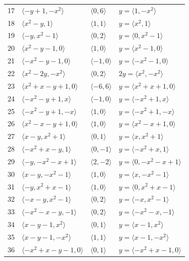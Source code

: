 \documentclass[11pt]{article}
\begin{document}
\begin{longtable}{@{}rlll@{}}
17 & $\langle -y+1,-x^{2}\rangle$ & $\langle 0,6\rangle$ & $y=\langle 1,-x^{2}\rangle$\\
18 & $\langle x^{2}-y,1\rangle$ & $\langle 1,1\rangle$ & $y=\langle x^{2},1\rangle$\\
19 & $\langle -y,x^{2}-1\rangle$ & $\langle 0,2\rangle$ & $y=\langle 0,x^{2}-1\rangle$\\
20 & $\langle x^{2}-y-1,0\rangle$ & $\langle 1,0\rangle$ & $y=\langle x^{2}-1,0\rangle$\\
21 & $\langle -x^{2}-y-1,0\rangle$ & $\langle -1,0\rangle$ & $y=\langle -x^{2}-1,0\rangle$\\
22 & $\langle x^{2}-2y,-x^{2}\rangle$ & $\langle 0,2\rangle$ & $2y=\langle x^{2},-x^{2}\rangle$\\
23 & $\langle x^{2}+x-y+1,0\rangle$ & $\langle -6,6\rangle$ & $y=\langle x^{2}+x+1,0\rangle$\\
24 & $\langle -x^{2}-y+1,x\rangle$ & $\langle -1,0\rangle$ & $y=\langle -x^{2}+1,x\rangle$\\
25 & $\langle -x^{2}-y+1,-x\rangle$ & $\langle 1,0\rangle$ & $y=\langle -x^{2}+1,-x\rangle$\\
26 & $\langle x^{2}-x-y+1,0\rangle$ & $\langle 1,0\rangle$ & $y=\langle x^{2}-x+1,0\rangle$\\
27 & $\langle x-y,x^{2}+1\rangle$ & $\langle 0,1\rangle$ & $y=\langle x,x^{2}+1\rangle$\\
28 & $\langle -x^{2}+x-y,1\rangle$ & $\langle 0,-1\rangle$ & $y=\langle -x^{2}+x,1\rangle$\\
29 & $\langle -y,-x^{2}-x+1\rangle$ & $\langle 2,-2\rangle$ & $y=\langle 0,-x^{2}-x+1\rangle$\\
30 & $\langle x-y,-x^{2}-1\rangle$ & $\langle 1,0\rangle$ & $y=\langle x,-x^{2}-1\rangle$\\
31 & $\langle -y,x^{2}+x-1\rangle$ & $\langle 1,0\rangle$ & $y=\langle 0,x^{2}+x-1\rangle$\\
32 & $\langle -x-y,x^{2}-1\rangle$ & $\langle 0,2\rangle$ & $y=\langle -x,x^{2}-1\rangle$\\
33 & $\langle -x^{2}-x-y,-1\rangle$ & $\langle 0,2\rangle$ & $y=\langle -x^{2}-x,-1\rangle$\\
34 & $\langle x-y-1,x^{2}\rangle$ & $\langle 0,1\rangle$ & $y=\langle x-1,x^{2}\rangle$\\
35 & $\langle x-y-1,-x^{2}\rangle$ & $\langle 1,1\rangle$ & $y=\langle x-1,-x^{2}\rangle$\\
36 & $\langle -x^{2}+x-y-1,0\rangle$ & $\langle 0,1\rangle$ & $y=\langle -x^{2}+x-1,0\rangle$\\

\end{longtable}
\end{document}
